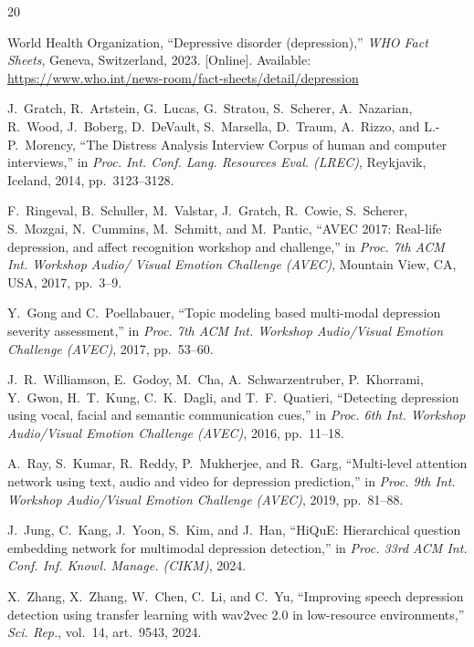 \documentclass[5p,twocolumn]{elsarticle}
\begin{document}
\begin{thebibliography}{20}

World Health Organization, ``Depressive disorder (depression),''
\textit{WHO Fact Sheets}, Geneva, Switzerland, 2023.
[Online]. Available: \url{https://www.who.int/news-room/fact-sheets/detail/depression}

J.~Gratch, R.~Artstein, G.~Lucas, G.~Stratou, S.~Scherer,
A.~Nazarian, R.~Wood, J.~Boberg, D.~DeVault, S.~Marsella,
D.~Traum, A.~Rizzo, and L.-P.~Morency,
``The Distress Analysis Interview Corpus of human and computer
interviews,'' in \textit{Proc. Int. Conf. Lang. Resources Eval.
(LREC)}, Reykjavik, Iceland, 2014, pp.~3123--3128.

F.~Ringeval, B.~Schuller, M.~Valstar, J.~Gratch, R.~Cowie,
S.~Scherer, S.~Mozgai, N.~Cummins, M.~Schmitt, and M.~Pantic,
``AVEC 2017: Real-life depression, and affect recognition workshop
and challenge,'' in \textit{Proc. 7th ACM Int. Workshop Audio/
Visual Emotion Challenge (AVEC)}, Mountain View, CA, USA, 2017,
pp.~3--9.

Y.~Gong and C.~Poellabauer,
``Topic modeling based multi-modal depression severity assessment,''
in \textit{Proc. 7th ACM Int. Workshop Audio/Visual Emotion
Challenge (AVEC)}, 2017, pp.~53--60.

J.~R.~Williamson, E.~Godoy, M.~Cha, A.~Schwarzentruber,
P.~Khorrami, Y.~Gwon, H.~T.~Kung, C.~K.~Dagli, and T.~F.~Quatieri,
``Detecting depression using vocal, facial and semantic
communication cues,'' in \textit{Proc. 6th Int. Workshop
Audio/Visual Emotion Challenge (AVEC)}, 2016, pp.~11--18.

A.~Ray, S.~Kumar, R.~Reddy, P.~Mukherjee, and R.~Garg,
``Multi-level attention network using text, audio and video
for depression prediction,'' in \textit{Proc. 9th Int. Workshop
Audio/Visual Emotion Challenge (AVEC)}, 2019, pp.~81--88.

J.~Jung, C.~Kang, J.~Yoon, S.~Kim, and J.~Han,
``HiQuE: Hierarchical question embedding network for multimodal
depression detection,'' in \textit{Proc. 33rd ACM Int. Conf. Inf.
Knowl. Manage. (CIKM)}, 2024.

X.~Zhang, X.~Zhang, W.~Chen, C.~Li, and C.~Yu,
``Improving speech depression detection using transfer learning with
wav2vec 2.0 in low-resource environments,''
\textit{Sci. Rep.}, vol.~14, art.~9543, 2024.


\end{thebibliography}
\end{document}
